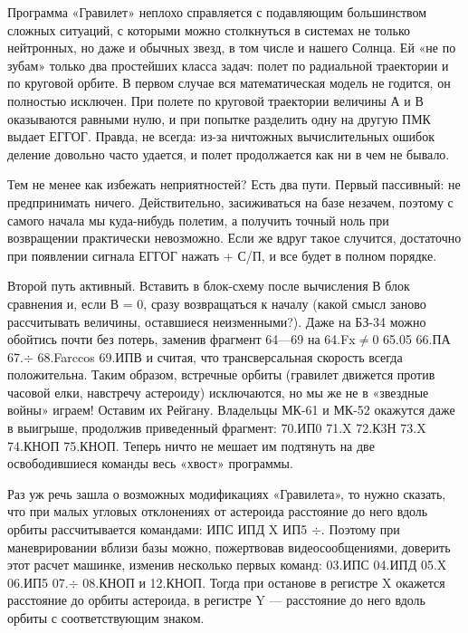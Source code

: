 \documentclass[11pt,a4paper,oneside]{article}
\begin{document}
Программа «Гравилет» неплохо справляется с подавляющим большинством сложных ситуаций, с которыми можно столкнуться в системах не только нейтронных, но даже и обычных звезд, в том числе и нашего Солнца. Ей «не по зубам» только два простейших класса задач: полет по радиальной траектории и по круговой орбите. В первом случае вся математическая модель не годится, он полностью исключен. При полете по круговой траектории величины А и В оказываются равными нулю, и при попытке разделить одну на другую ПМК выдает ЕГГОГ. Правда, не всегда: из-за ничтожных вычислительных ошибок деление довольно часто удается, и полет продолжается как ни в чем не бывало.

Тем не менее как избежать неприятностей? Есть два пути. Первый пассивный: не предпринимать ничего. Действительно, засиживаться на базе незачем, поэтому с самого начала мы куда-нибудь полетим, а получить точный ноль при возвращении практически невозможно. Если же вдруг такое случится, достаточно при появлении сигнала ЕГГОГ нажать + С/П, и все будет в полном порядке.

Второй путь активный. Вставить в блок-схему после вычисления В блок сравнения и, если В = 0, сразу возвращаться к началу (какой смысл заново рассчитывать величины, оставшиеся неизменными?). Даже на БЗ-34 можно обойтись почти без потерь, заменив фрагмент 64—69 на 64.Fx$\neq$0 65.05 66.ПА 67.$\div$ 68.Farccos 69.ИПВ и считая, что трансверсальная скорость всегда положительна. Таким образом, встречные орбиты (гравилет движется против часовой елки, навстречу астероиду) исключаются, но мы же не в «звездные войны» играем! Оставим их Рейгану. Владельцы МК-61 и МК-52 окажутся даже в выигрыше, продолжив приведенный фрагмент: 70.ИП0 71.X 72.К3Н 73.X 74.КНОП 75.КНОП. Теперь ничто не мешает им подтянуть на две освободившиеся команды весь «хвост» программы.

Раз уж речь зашла о возможных модификациях «Гравилета», то нужно сказать, что при малых угловых отклонениях от астероида расстояние до него вдоль орбиты рассчитывается командами: ИПС ИПД X ИП5 $\div$. Поэтому при маневрировании вблизи базы можно, пожертвовав видеосообщениями, доверить этот расчет машинке, изменив несколько первых команд: 03.ИПС 04.ИПД 05.X 06.ИП5 07.$\div$ 08.КНОП и 12.КНОП. Тогда при останове в регистре X окажется расстояние до орбиты астероида, в регистре Y — расстояние до него вдоль орбиты с соответствующим знаком.
\end{document}
